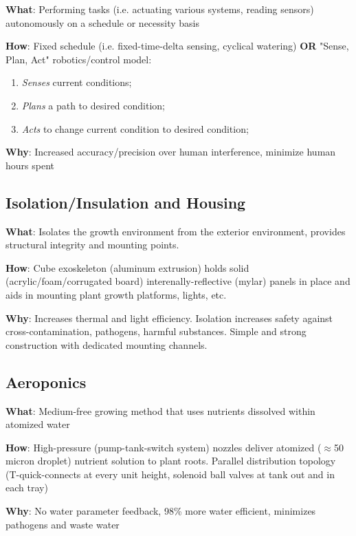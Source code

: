 \documentclass{report}
\begin{document}
\textbf{What}: Performing tasks (i.e. actuating various systems, reading sensors) autonomously on a schedule or necessity basis

\textbf{How}: Fixed schedule (i.e. fixed-time-delta sensing, cyclical watering) \textbf{OR} "Sense, Plan, Act" robotics/control model:
\begin{enumerate}
    \item \textit{Senses} current conditions;
    \item \textit{Plans} a path to desired condition;
    \item \textit{Acts} to change current condition to desired condition;
\end{enumerate}
\textbf{Why}: Increased accuracy/precision over human interference, minimize human hours spent

\subsection{Isolation/Insulation and Housing}
\label{sec:isolationinsulation}

\textbf{What}: Isolates the growth environment from the exterior environment, provides structural integrity and mounting points.

\textbf{How}: Cube exoskeleton (aluminum extrusion) holds solid (acrylic/foam/corrugated board) interenally-reflective (mylar) panels in place and aids in mounting plant growth platforms, lights, etc.

\textbf{Why}: Increases thermal and light efficiency. Isolation increases safety against cross-contamination, pathogens, harmful substances. Simple and strong construction with dedicated mounting channels.

\subsection{Aeroponics}
\label{sec:aeroponics}

\textbf{What}: Medium-free growing method that uses nutrients dissolved within atomized water

\textbf{How}: High-pressure (pump-tank-switch system) nozzles deliver atomized ($\approx$50 micron droplet) nutrient solution to plant roots. Parallel distribution topology (T-quick-connects at every unit height, solenoid ball valves at tank out and in each tray)

\textbf{Why}: No water parameter feedback, 98\% more water efficient, minimizes pathogens and waste water
\end{document}
